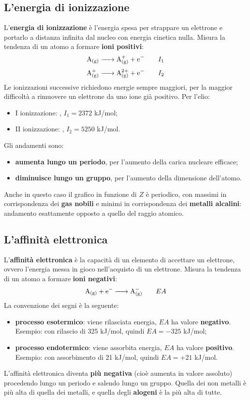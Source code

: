 \documentclass[11pt, a4paper, openright]{book}
\begin{document}
\subsection{L'energia di ionizzazione}
L'\textbf{energia di ionizzazione} è l'energia spesa per strappare un elettrone e portarlo a distanza infinita dal nucleo con energia cinetica nulla. Misura la tendenza di un atomo a formare \textbf{ioni positivi}:
\[
\ce{A_{(g)} -> A^+_{(g)} + e^-} \qquad I_1
\]
\[
\ce{A^+_{(g)} -> A^{2+}_{(g)} + e^-} \qquad I_2
\]
Le ionizzazioni successive richiedono energie sempre maggiori, per la maggior difficoltà a rimuovere un elettrone da uno ione già positivo. Per l'elio:
\begin{itemize}
    \item I ionizzazione: , $I_1 = 2372$ kJ/mol;
    \item II ionizzazione: , $I_2 = 5250$ kJ/mol.
\end{itemize}
Gli andamenti sono:
\begin{itemize}
    \item \textbf{aumenta lungo un periodo}, per l'aumento della carica nucleare efficace;
    \item \textbf{diminuisce lungo un gruppo}, per l'aumento della dimensione dell'atomo.
\end{itemize}
Anche in questo caso il grafico in funzione di $Z$ è periodico, con massimi in corrispondenza dei \textbf{gas nobili} e minimi in corrispondenza dei \textbf{metalli alcalini}: andamento esattamente opposto a quello del raggio atomico.

\subsection{L'affinità elettronica}
L'\textbf{affinità elettronica} è la capacità di un elemento di accettare un elettrone, ovvero l'energia messa in gioco nell'acquisto di un elettrone. Misura la tendenza di un atomo a formare \textbf{ioni negativi}:
\[
\ce{A_{(g)} + e^- -> A^-_{(g)}} \qquad EA
\]
La convenzione dei segni è la seguente:
\begin{itemize}
    \item \textbf{processo esotermico}: viene rilasciata energia, $EA$ ha valore \textbf{negativo}. Esempio:  con rilascio di 325 kJ/mol, quindi $EA = -325$ kJ/mol;
    \item \textbf{processo endotermico}: viene assorbita energia, $EA$ ha valore \textbf{positivo}. Esempio:  con assorbimento di 21 kJ/mol, quindi $EA = +21$ kJ/mol.
\end{itemize}
L'affinità elettronica diventa \textbf{più negativa} (cioè aumenta in valore assoluto) procedendo lungo un periodo e salendo lungo un gruppo. Quella dei non metalli è più alta di quella dei metalli, e quella degli \textbf{alogeni} è la più alta di tutte.
\end{document}
